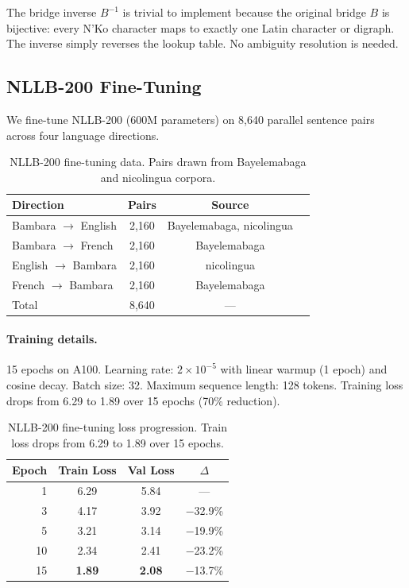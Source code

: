 \documentclass[11pt]{article}
\begin{document}
The bridge inverse $B^{-1}$ is trivial to implement because the original bridge $B$ is bijective: every N'Ko character maps to exactly one Latin character or digraph.
The inverse simply reverses the lookup table.
No ambiguity resolution is needed.

\subsection{NLLB-200 Fine-Tuning}

We fine-tune NLLB-200 (600M parameters) on 8,640 parallel sentence pairs across four language directions.

\begin{table}[t]
\centering
\small
\begin{tabular}{lccc}
\toprule
\textbf{Direction} & \textbf{Pairs} & \textbf{Source} \\
\midrule
Bambara $\to$ English & 2,160 & Bayelemabaga, nicolingua \\
Bambara $\to$ French & 2,160 & Bayelemabaga \\
English $\to$ Bambara & 2,160 & nicolingua \\
French $\to$ Bambara & 2,160 & Bayelemabaga \\
\midrule
Total & 8,640 & --- \\
\bottomrule
\end{tabular}
\caption{NLLB-200 fine-tuning data. Pairs drawn from Bayelemabaga and nicolingua corpora.}
\label{tab:nllb-data}
\end{table}

\paragraph{Training details.}
15 epochs on A100.
Learning rate: $2 \times 10^{-5}$ with linear warmup (1 epoch) and cosine decay.
Batch size: 32.
Maximum sequence length: 128 tokens.
Training loss drops from 6.29 to 1.89 over 15 epochs (70\% reduction).

\begin{table}[t]
\centering
\small
\begin{tabular}{rccc}
\toprule
\textbf{Epoch} & \textbf{Train Loss} & \textbf{Val Loss} & \textbf{$\Delta$} \\
\midrule
1 & 6.29 & 5.84 & --- \\
3 & 4.17 & 3.92 & $-$32.9\% \\
5 & 3.21 & 3.14 & $-$19.9\% \\
10 & 2.34 & 2.41 & $-$23.2\% \\
15 & \textbf{1.89} & \textbf{2.08} & $-$13.7\% \\
\bottomrule
\end{tabular}
\caption{NLLB-200 fine-tuning loss progression. Train loss drops from 6.29 to 1.89 over 15 epochs.}
\label{tab:nllb-training}
\end{table}
\end{document}
